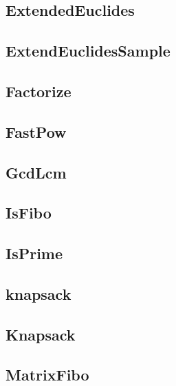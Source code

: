 \subsection{ ExtendedEuclides}
\raggedbottom
\hrulefill
\subsection{ ExtendEuclidesSample}
\raggedbottom
\hrulefill
\subsection{ Factorize}
\raggedbottom
\hrulefill
\subsection{ FastPow}
\raggedbottom
\hrulefill
\subsection{ GcdLcm}
\raggedbottom
\hrulefill
\subsection{ IsFibo}
\raggedbottom
\hrulefill
\subsection{ IsPrime}
\raggedbottom
\hrulefill
\subsection{ knapsack}
\raggedbottom
\hrulefill
\subsection{ Knapsack}
\raggedbottom
\hrulefill
\subsection{ MatrixFibo}
\raggedbottom
\hrulefill
